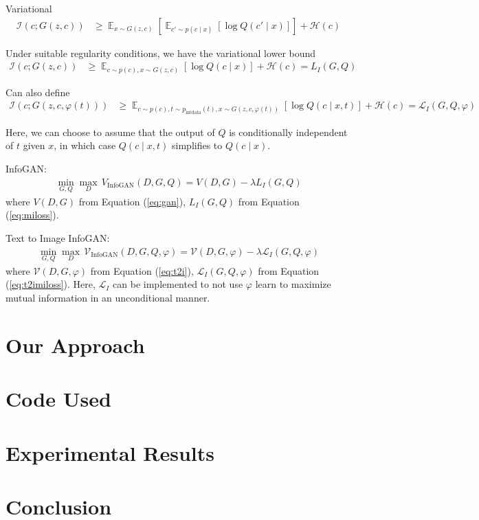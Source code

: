 \documentclass{article}
\DeclareMathOperator*{\E}{\mathbb{E}}
\begin{document}
Variational 
\begin{align}
\mathcal{I}(c;G(z,c)) &\geq \E_{x\sim G(z,c)}\left[\E_{c'\sim p(c\mid x)}\left[\log Q(c'\mid x)\right]\right] + \mathcal{H}(c)
\end{align}

Under suitable regularity conditions, we have the variational lower bound 
\begin{align}
\mathcal{I}(c;G(z,c)) &\geq \E_{c\sim p(c), x\sim G(z,c)}\left[\log Q(c\mid x)\right] + \mathcal{H}(c) = L_I(G,Q) \label{eq:miloss}
\end{align}

Can also define
\begin{align}
\mathcal{I}(c;G(z,c, \varphi(t))) &\geq \E_{c\sim p(c), t\sim p_{\text{intdata}}(t), x\sim G(z,c, \varphi(t))}\left[\log Q(c\mid x,t)\right] + \mathcal{H}(c) = \mathcal{L}_I(G,Q,\varphi) \label{eq:t2imiloss}
\end{align}

Here, we can choose to assume that the output of $Q$ is conditionally independent of $t$ given $x$, in which case $Q(c\mid x,t)$ simplifies to $Q(c\mid x)$.

InfoGAN:
\begin{align}
\min_{G,Q} \max_D\, V_{\text{InfoGAN}}(D,G,Q) = V(D,G) - \lambda L_I(G,Q)
\end{align}
where $V(D,G)$ from Equation (\ref{eq:gan}), $L_I(G,Q)$ from Equation (\ref{eq:miloss}).

Text to Image InfoGAN:
\begin{align}
\min_{G,Q} \max_D\, \mathcal{V}_{\text{InfoGAN}}(D,G,Q,\varphi) = \mathcal{V}(D,G,\varphi) - \lambda \mathcal{L}_I(G,Q,\varphi)
\end{align}
where $\mathcal{V}(D,G,\varphi)$ from Equation (\ref{eq:t2i}), $\mathcal{L}_I(G,Q,\varphi)$ from Equation (\ref{eq:t2imiloss}). Here, $\mathcal{L}_I$ can be implemented to not use $\varphi$ learn to maximize mutual information in an unconditional manner.




\section{Our Approach}

\section{Code Used}

\section{Experimental Results}

\section{Conclusion}

\printbibliography
\end{document}

